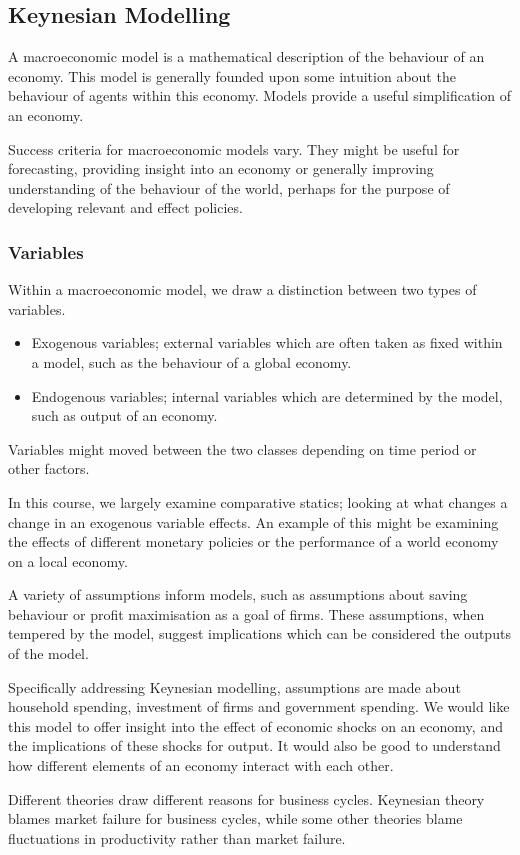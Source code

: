 \documentclass[12pt]{report}
\begin{document}
\begin{flushleft}
\subsection*{Keynesian Modelling}

A macroeconomic model is a mathematical description of the behaviour of an 
economy. This model is generally founded upon some intuition about the 
behaviour of agents within this economy. Models provide a useful simplification
of an economy. \par
Success criteria for macroeconomic models vary. They might be useful for 
forecasting, providing insight into an economy or generally improving 
understanding of the behaviour of the world, perhaps for the purpose of 
developing relevant and effect policies.

\subsubsection*{Variables}

Within a macroeconomic model, we draw a distinction between two types of 
variables.
\begin{itemize}
    \item Exogenous variables; external variables which are often taken as 
        fixed within a model, such as the behaviour of a global economy.
    \item Endogenous variables; internal variables which are determined by
        the model, such as output of an economy.
\end{itemize}
Variables might moved between the two classes depending on time period or other
factors. \par
In this course, we largely examine comparative statics; looking at what changes
a change in an exogenous variable effects. An example of this might be 
examining the effects of different monetary policies or the performance of a
world economy on a local economy. \par
A variety of assumptions inform models, such as assumptions about saving 
behaviour or profit maximisation as a goal of firms. These assumptions, when
tempered by the model, suggest implications which can be considered the outputs
of the model. \par
Specifically addressing Keynesian modelling, assumptions are made about 
household spending, investment of firms and government spending. We would like
this model to offer insight into the effect of economic shocks on an economy,
and the implications of these shocks for output. It would also be good to 
understand how different elements of an economy interact with each other. \par
Different theories draw different reasons for business cycles. Keynesian theory
blames market failure for business cycles, while some other theories blame
fluctuations in productivity rather than market failure.


\end{flushleft}
\end{document}
